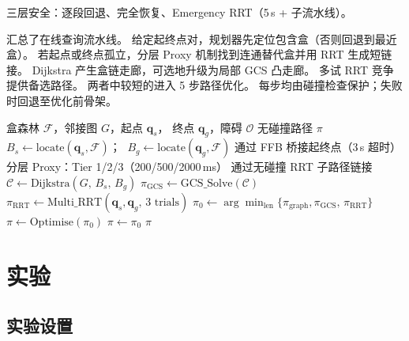 \documentclass[journal]{IEEEtran}
\begin{document}
三层安全：逐段回退、完全恢复、Emergency RRT（5\,s + 子流水线）。

 汇总了在线查询流水线。
给定起终点对，规划器先定位包含盒（否则回退到最近盒）。
若起点或终点孤立，分层 Proxy 机制找到连通替代盒并用 RRT 生成短链接。
Dijkstra 产生盒链走廊，可选地升级为局部 GCS 凸走廊。
多试 RRT 竞争提供备选路径。
两者中较短的进入 5 步路径优化。
每步均由碰撞检查保护；失败时回退至优化前骨架。

\begin{algorithm}[t]
\caption{在线查询流水线}\label{alg:query}
\footnotesize
\begin{algorithmic}[1]
\REQUIRE 盒森林 $\mathcal{F}$，邻接图 $G$，起点 $\bm{q}_s$，
  终点 $\bm{q}_g$，障碍 $\mathcal{O}$
\ENSURE 无碰撞路径 $\pi$
\STATE {}
\STATE $B_s \leftarrow \mathrm{locate}(\bm{q}_s, \mathcal{F})$；
  $\;B_g \leftarrow \mathrm{locate}(\bm{q}_g, \mathcal{F})$
  \hfill{}
  \STATE 通过 FFB 桥接起终点（3\,s 超时）
\ENDIF
\STATE {}
  \STATE 分层 Proxy：Tier 1/2/3（200/500/2000\,ms）
  \STATE 通过无碰撞 RRT 子路径链接
\ENDIF
\STATE {}
\STATE $\mathcal{C} \leftarrow \text{Dijkstra}(G,\, B_s,\, B_g)$
  \hfill{}
\STATE {}
  \STATE $\pi_{\text{GCS}} \leftarrow \text{GCS\_Solve}(\mathcal{C})$
\ENDIF
\STATE {}
\STATE $\pi_{\text{RRT}} \leftarrow
  \text{Multi\_RRT}(\bm{q}_s, \bm{q}_g,\, 3\text{ trials})$
\STATE $\pi_0 \leftarrow \arg\min_{\text{len}}\{\pi_{\text{graph}},
  \pi_{\text{GCS}},\, \pi_{\text{RRT}}\}$
\STATE {}
\STATE $\pi \leftarrow \text{Optimise}(\pi_0)$
  \hfill{}
  \STATE $\pi \leftarrow \pi_0$  \hfill{}
\ENDIF
\RETURN $\pi$
\end{algorithmic}
\end{algorithm}

\section{实验}\label{sec:experiments}

\subsection{实验设置}
\end{document}
